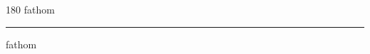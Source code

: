 
\begin{frame}
\begin{center}
\begin{turn}{180}
{\fontsize{2.5cm}{1em}\selectfont fathom}
\end{turn}
\vspace{1em}\par  
\hrule
\vspace{1em}\par  
{\fontsize{2.5cm}{1em}\selectfont fathom}
\end{center}
\end{frame}

